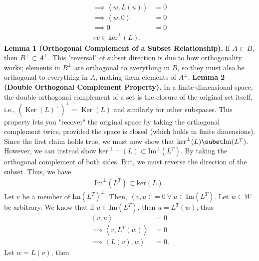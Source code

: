 \documentclass{report}
\begin{document}
\begin{itemize}
\begin{align*}
                \implies \left\langle w, L(u) \right\rangle &= 0 \\
                \implies \left\langle w, 0  \right\rangle &= 0 \\
                \implies 0 &= 0\\ 
                \therefore v \in \text{ker}^{\perp}(L)
            .\end{align*}
            \bigbreak \noindent 
            \textbf{Lemma 1 (Orthogonal Complement of a Subset Relationship).} If \( A \subset B \), then \( B^{\perp} \subset A^{\perp} \). This "reversal" of subset direction is due to how orthogonality works; elements in \( B^{\perp} \) are orthogonal to everything in \( B \), so they must also be orthogonal to everything in \( A \), making them elements of \( A^{\perp} \).
            \bigbreak \noindent 
            \textbf{Lemma 2 (Double Orthogonal Complement Property).} In a finite-dimensional space, the double orthogonal complement of a set is the closure of the original set itself, i.e., \( ( \operatorname{Ker}(L)^{\perp} )^{\perp} = \operatorname{Ker}(L) \) and similarly for other subspaces. This property lets you "recover" the original space by taking the orthogonal complement twice, provided the space is closed (which holds in finite dimensions).
            \bigbreak \noindent 
            Since the first claim holds true, we must now show that $\text{ker}^{\perp}(L) \subet \text{Im}(L^{T})$. However, we can instead show $\text{ker}^{\perp\perp}(L) \subset \text{Im}^{\perp}(L^{T})$. By taking the orthogonal complement of both sides. But, we must reverse the direction of the subset. Thus, we have
            \begin{align*}
                \text{Im}^{\perp}(L^{T}) \subset \text{ker}(L)
            .\end{align*}
            \bigbreak \noindent 
            Let $v$ be a member of $\text{Im}(L^{T})^{\perp}$. Then, $\left\langle v,u \right\rangle  = 0 \ \forall \ u\in \text{Im}(L^{T})$. Let $w\in W$ be arbitrary. We know that if $u \in \text{Im}(L^{T})$, then $u = L^{T}(w)$, thus
            \begin{align*}
                \left\langle v,u \right\rangle &= 0 \\
                \implies \left\langle v, L^{T}(w) \right\rangle &= 0\\
                \implies \left\langle L(v), w \right\rangle &= 0
            .\end{align*}
            Let $w=L(v)$, then
            \begin{align*}

\end{align*}
\end{itemize}
\end{document}
